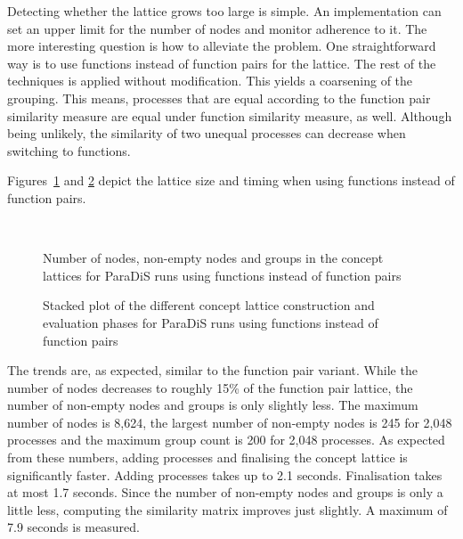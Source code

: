 \documentclass[a4paper, final, diplominf]{zih-template}
\begin{document}
Detecting whether the lattice grows too large is simple.
An implementation can set an upper limit for the number of nodes and monitor adherence to it.
The more interesting question is how to alleviate the problem.
One straightforward way is to use functions instead of function pairs for the lattice.
The rest of the techniques is applied without modification.
This yields a coarsening of the grouping.
This means, processes that are equal according to the function pair similarity measure are equal under function similarity measure, as well.
Although being unlikely, the similarity of two unequal processes can decrease when switching to functions.
%
%

Figures~\ref{fig:paradis-l-node-and-group-counts} and \ref{fig:paradis-l-lattice-timing} depict the lattice size and timing when using functions instead of function pairs.
\begin{figure}[tbp]
	\centering
	
	
	\\[0.5cm]
	\begin{minipage}{13cm}\raggedright
		
	\end{minipage}
	\caption{Number of nodes, non-empty nodes and groups in the concept lattices for ParaDiS runs using functions instead of function pairs}
	\label{fig:paradis-l-node-and-group-counts}
\end{figure}
\begin{figure}[tbp]
	\centering
	
	\caption{Stacked plot of the different concept lattice construction and evaluation phases for ParaDiS runs using functions instead of function pairs}
	\label{fig:paradis-l-lattice-timing}
\end{figure}
The trends are, as expected, similar to the function pair variant.
While the number of nodes decreases to roughly 15\% of the function pair lattice, the number of non-empty nodes and groups is only slightly less.
The maximum number of nodes is 8,624, the largest number of non-empty nodes is 245 for 2,048 processes and the maximum group count is 200 for 2,048 processes.
As expected from these numbers, adding processes and finalising the concept lattice is significantly faster.
Adding processes takes up to 2.1 seconds.
Finalisation takes at most 1.7 seconds.
Since the number of non-empty nodes and groups is only a little less, computing the similarity matrix improves just slightly.
A maximum of 7.9 seconds is measured.
\end{document}
